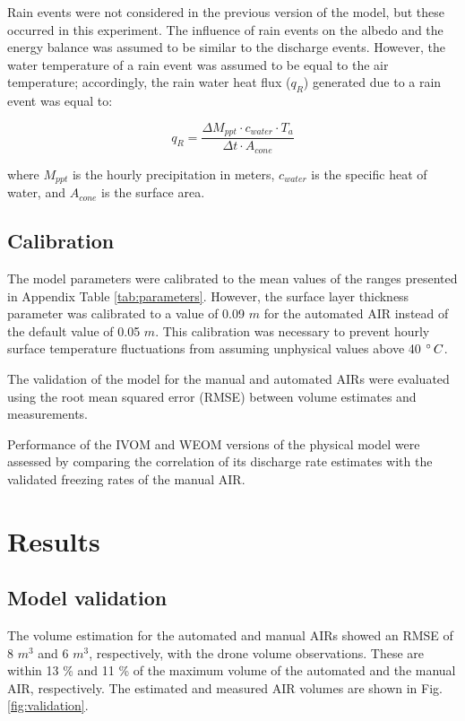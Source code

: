 \documentclass[tc, manuscript]{copernicus}
\begin{document}
Rain events were not considered in the previous version of the model, but these occurred in this experiment. The
influence of rain events on the albedo and the energy balance was assumed to be similar to the discharge events.
However, the water temperature of a rain event was assumed to be equal to the air temperature; accordingly, the
rain water heat flux ($q_{R}$) generated due to a rain event was equal to:

\begin{equation}
  q_{R} = \frac{\Delta M_{ppt} \cdot c_{water} \cdot T_{a}}{\Delta t \cdot A_{cone}}
\end{equation}

where $M_{ppt}$ is the hourly precipitation in meters, $c_{water}$ is the specific heat of water, and $A_{cone}$
is the surface area.

\subsection{Calibration}

The model parameters were calibrated to the mean values of the ranges presented in Appendix Table
\ref{tab:parameters}. However, the surface layer thickness parameter was calibrated to a value of 0.09 $m$ for
the automated AIR instead of the default value of 0.05 $m$. This calibration was necessary to prevent hourly
surface temperature fluctuations from assuming unphysical values above 40 $^{\circ}\,C$.

The validation of the model for the manual and automated AIRs were evaluated using the root mean squared
error (RMSE) between volume estimates and measurements. 

Performance of the IVOM and WEOM versions of the physical model were assessed by comparing the correlation of its
discharge rate estimates with the validated freezing rates of the manual AIR.

\section{Results}

\subsection{Model validation}

The volume estimation for the automated and manual AIRs showed an RMSE of 8 $m^3$ and 6 $m^3$, respectively,
with the drone volume observations. These are within 13 \% and 11 \% of the maximum volume of the automated and
the manual AIR, respectively. The estimated and measured AIR volumes are shown in Fig. \ref{fig:validation}.  
\end{document}
